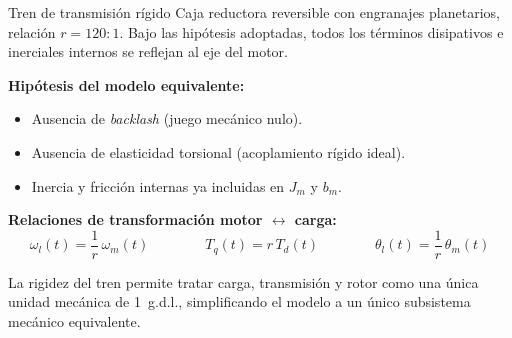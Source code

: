 \documentclass[aspectratio=169,t]{beamer}
\begin{document}
\begin{frame}{Tren de transmisión rígido}
{\small\color{uncGray}Caja reductora reversible con engranajes planetarios, relación $r=120{:}1$. Bajo las hipótesis adoptadas, todos los términos disipativos e inerciales internos se reflejan al eje del motor.}\par
\vspace{4mm}

\textbf{Hipótesis del modelo equivalente:}
\begin{itemize}
\item Ausencia de \textit{backlash} (juego mecánico nulo).
\item Ausencia de elasticidad torsional (acoplamiento rígido ideal).
\item Inercia y fricción internas ya incluidas en $J_m$ y $b_m$.
\end{itemize}

\vspace{4mm}
\textbf{Relaciones de transformación motor $\leftrightarrow$ carga:}
\begin{equation*}
\omega_l(t) = \frac{1}{r}\,\omega_m(t)
\qquad\qquad
T_q(t) = r\,T_d(t)
\qquad\qquad
\theta_l(t) = \frac{1}{r}\,\theta_m(t)
\end{equation*}

\vspace{4mm}
{\small La rigidez del tren permite tratar carga, transmisión y rotor como una única unidad mecánica de 1~g.d.l., simplificando el modelo a un único subsistema mecánico equivalente.}
\end{frame}
\end{document}
